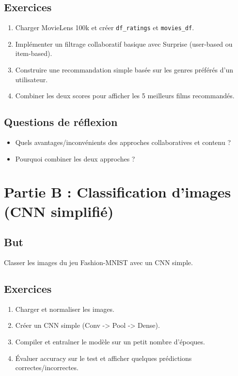 \documentclass[a4paper,12pt]{article}
\begin{document}
\subsection*{Exercices}
\begin{enumerate}
\item Charger MovieLens 100k et créer \texttt{df\_ratings} et \texttt{movies\_df}.
\item Implémenter un filtrage collaboratif basique avec Surprise (user-based ou item-based).
\item Construire une recommandation simple basée sur les genres préférés d'un utilisateur.
\item Combiner les deux scores pour afficher les 5 meilleurs films recommandés.
\end{enumerate}

\subsection*{Questions de réflexion}
\begin{itemize}
\item Quels avantages/inconvénients des approches collaboratives et contenu ?
\item Pourquoi combiner les deux approches ?
\end{itemize}

\section*{Partie B : Classification d'images (CNN simplifié)}
\subsection*{But}
Classer les images du jeu Fashion-MNIST avec un CNN simple.

\subsection*{Exercices}
\begin{enumerate}
\item Charger et normaliser les images.
\item Créer un CNN simple (Conv -> Pool -> Dense).
\item Compiler et entraîner le modèle sur un petit nombre d'époques.
\item Évaluer accuracy sur le test et afficher quelques prédictions correctes/incorrectes.
\end{enumerate}
\end{document}
